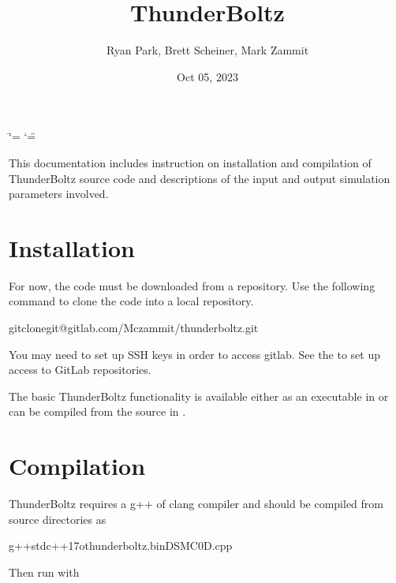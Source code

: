 \documentclass[letterpaper,10pt,english,openany,oneside]{sphinxmanual}
\title{ThunderBoltz}
\date{Oct 05, 2023}
\author{Ryan Park, Brett Scheiner, Mark Zammit}
\affil{Los Alamos National Laboratory, Los Alamos, NM, 87545}
\begin{document}
\ifdefined\shorthandoff
  \ifnum\catcode`\=\string=\active\shorthandoff{=}\fi
  \ifnum\catcode`\"=\active{}\fi
\fi

\pagestyle{empty}
\sphinxmaketitle
\pagestyle{plain}
\sphinxtableofcontents
\pagestyle{normal}
\label{\detokenize{short_index::doc}}


\sphinxAtStartPar
This documentation includes instruction on installation
and compilation of ThunderBoltz source code and descriptions
of the input and output simulation parameters involved.


\chapter{Installation}
\label{\detokenize{short_index:installation}}
\sphinxAtStartPar
For now, the code must be downloaded from a repository.
Use the following command to clone the code into a local repository.

\begin{sphinxVerbatim}[commandchars=\\\{\}]
gitclonegit@gitlab.com/Mczammit/thunderboltz.git
\end{sphinxVerbatim}

\sphinxAtStartPar
You may need to set up SSH keys in order to access gitlab. See the
 to
set up access to GitLab repositories.

\sphinxAtStartPar
The basic ThunderBoltz functionality is available either
as an executable in  or can be compiled from the
source in .

\chapter{Compilation}
\label{\detokenize{short_index:compilation}}
\sphinxAtStartPar
ThunderBoltz requires a g++ of clang compiler and should be compiled
from source directories as

\begin{sphinxVerbatim}[commandchars=\\\{\}]
g++\PYGZhy{}stdc++17\PYGZhy{}othunderboltz.binDSMC0D.cpp
\end{sphinxVerbatim}

\sphinxAtStartPar
Then run with
\end{document}
